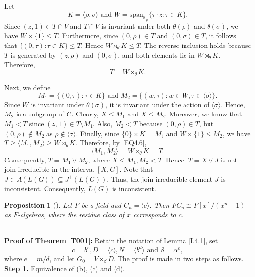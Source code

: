 \documentclass[12pt]{article}
\newtheorem{proposition}{\bf Proposition}[section]
\def\QEDopen{{\setlength{\fboxsep}{0pt}\setlength{\fboxrule}{0.2pt}\fbox{\rule[0pt]{0pt}{1.3ex}\rule[0pt]{1.3ex}{0pt}}}}
\def\QED{\QEDopen}
\def\endproof{\hspace*{\fill}~\QED\par\endtrivlist\unskip}
\begin{document}
Let $$K=\langle\rho,\sigma\rangle \mbox { and }W=\mbox{span}_{\mathbb F_p}\{\tau\cdot z:\tau\in K\}.$$
Since $(z,1)\in T\cap V$ and $T\cap V$ is invariant under both $\theta(\rho)$ and $\theta(\sigma)$, we have $W\times\{1\}\leq T$. Furthermore, since $(0,\rho)\in T$ and $(0,\sigma)\in T$, it follows that $\{(0,\tau): \tau\in K\}\leq T$.
Hence $W\rtimes_{\theta} K\leq T$.
The reverse inclusion holds because $T$ is generated by
$(z,\rho)$ and $(0,\sigma)$, and both elements lie in
$W\rtimes_{\theta} K$. Therefore,   
\begin{equation}\label{EQ4.6}
T=W\rtimes_{\theta} K.  
\end{equation}

Next, we define $$M_1=\{(0,\tau): \tau\in K\}\mbox{ and }M_2=\{(w,\tau): w\in W, \tau\in \langle\sigma\rangle\}.$$ 
Since $W$ is invariant under $\theta(\sigma)$, it is invariant under
the action of $\langle\sigma\rangle$. Hence, $M_2$ is a subgroup of $G$. Clearly, $X\leq M_1$ and $X\leq M_2$. Moreover, we know that $M_1<T$ since $(z,1)\in T\setminus M_1$. Also, $M_2<T$ because $(0,\rho)\in T$, but $(0,\rho)\notin M_2$ as $\rho\notin \langle\sigma\rangle$. Finally, since $\{0\}\times K=M_1$ and $W\times\{1\}\leq M_2$, we have $T\geq \langle M_1, M_2\rangle\geq W\rtimes_{\theta} K$. Therefore, by \eqref{EQ4.6},
$$\langle M_1, M_2\rangle=W\rtimes_{\theta} K=T.$$
Consequently, $T=M_1\vee M_2$, where $X\leq M_1, M_2<T$.
Hence, $T=X\vee J$ is not join-irreducible in the interval $[X, G]$. Note that $J\in A(L(G))\subseteq J^{+}(L(G))$. Thus, the join-irreducible element $J$ is inconsistent. Consequently, $L(G)$ is inconsistent.
\endproof
\begin{proposition}[\cite{Webb}]\label{qp03}
Let $F$ be a field and $C_n=\langle c\rangle$. Then $FC_n\cong F[x]/(x^n-1)$ as $F$-algebras, where the residue class of $x$ corresponds to $c$.   
\end{proposition}
\quad\\
\textbf{Proof of Theorem \ref{T001}:}
Retain the notation of Lemma \ref{L4.1}, set $$c=b^e, D=\langle c\rangle, N=\langle b^d\rangle \mbox{ and }\beta=\alpha^e,$$ 
where $e=m/d$, and let $G_0=V\rtimes_\beta D$. The proof is made in two steps as follows. \\
\textbf{Step 1.} Equivalence of (b), (c) and (d).
\end{document}
